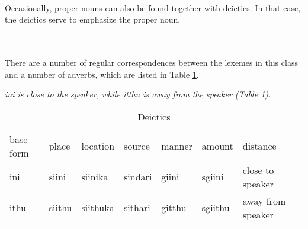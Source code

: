  \\
Occasionally, proper nouns can also be found together with deictics. In that case, the deictics serve to emphasize the proper noun.

 \\
\\



There are a number of regular correspondences between the lexemes in this class and a number of adverbs, which are listed in Table \ref{tab:Deictics}.

\em ini \em is close to the speaker, while \em itthu \em is away from the speaker (Table \ref{tab:Deictics}).

\begin{table}
	\begin{center}
	\begin{tabular}{lllllll}
	base form & place  	& location	&source & manner& amount	& distance \\
	ini 	& siini 	& siinika 	&sindari&  giini & sgiini 	& close to speaker \\
	ithu 	& siithu 	& siithuka 	&sithari& gitthu& sgiithu 	& away from speaker \\
	\end{tabular}
	\end{center}
	\caption{Deictics}
	\label{tab:Deictics}
\end{table}

